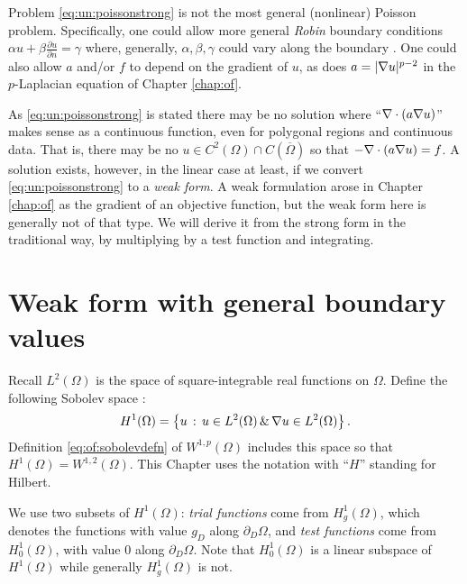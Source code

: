 Problem \eqref{eq:un:poissonstrong} is not the most general (nonlinear) Poisson problem.  Specifically, one could allow more general \emph{Robin} boundary conditions $\alpha u + \beta \frac{\partial u}{\partial n} = \gamma$ where, generally, $\alpha,\beta,\gamma$ could vary along the boundary \citep{Elmanetal2005}.  One could also allow $a$ and/or $f$ to depend on the gradient of $u$, as does $a=|\nabla u|^{p-2}$ in the $p$-Laplacian equation of Chapter \ref{chap:of}.

As \eqref{eq:un:poissonstrong} is stated there may be no solution where ``$\nabla\cdot(a\nabla u)$'' makes sense as a continuous function, even for polygonal regions and continuous data.  That is, there may be no $u\in C^2(\Omega) \cap C(\overline \Omega)$ so that $-\nabla\cdot(a\nabla u) = f$.  A solution exists, however, in the linear case at least, if we convert \eqref{eq:un:poissonstrong} to a \emph{weak form}.  A weak formulation arose in Chapter \ref{chap:of} as the gradient of an objective function, but the weak form here is generally not of that type.  We will derive it from the strong form in the traditional way, by multiplying by a test function and integrating.

\section{Weak form with general boundary values}

Recall $L^2(\Omega)$ is the space of square-integrable real functions on $\Omega$.  Define the following Sobolev space \citep{Evans2010}:
    $$H^1(\Omega) = \left\{u \,:\, u \in L^2(\Omega) \,\&\, \nabla u \in L^2(\Omega)\right\}.$$
Definition \eqref{eq:of:sobolevdefn} of $W^{1,p}(\Omega)$ includes this space so that $H^1(\Omega) = W^{1,2}(\Omega)$.  This Chapter uses the notation with ``$H$'' standing for Hilbert.

We use two subsets of $H^1(\Omega)$: \emph{trial functions} come from $H_{g}^1(\Omega)$, which denotes the functions with value $g_D$ along $\partial_D \Omega$, and \emph{test functions} come from $H_{0}^1(\Omega)$, with value $0$ along $\partial_D \Omega$.  Note that $H_{0}^1(\Omega)$ is a linear subspace of $H^1(\Omega)$ while generally $H_{g}^1(\Omega)$ is not.

